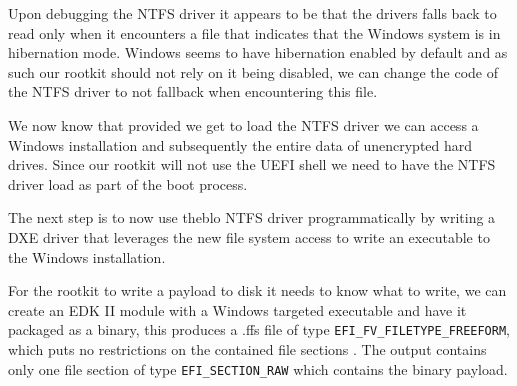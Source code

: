 Upon debugging the NTFS driver it appears to be that the drivers falls back to read only when it encounters a file that indicates that the Windows system is in hibernation mode. Windows seems to have hibernation enabled by default and as such our rootkit should not rely on it being disabled, we can change the code of the NTFS driver to not fallback when encountering this file.

We now know that provided we get to load the NTFS driver we can access a Windows installation and subsequently the entire data of unencrypted hard drives. Since our rootkit will not use the UEFI shell we need to have the NTFS driver load as part of the boot process.


The next step is to now use theblo NTFS driver programmatically by writing a DXE driver that leverages the new file system access to write an executable to the Windows installation.


For the rootkit to write a payload to disk it needs to know what to write, we can create an EDK II module with a Windows targeted executable and have it packaged as a binary, this produces a .ffs file of type \lstinline{EFI_FV_FILETYPE_FREEFORM}, which puts no restrictions on the contained file sections \cite[Vol 3, 2.1.4.1.7]{pi-spec}. The output contains only one file section of type \lstinline{EFI_SECTION_RAW} which contains the binary payload.

